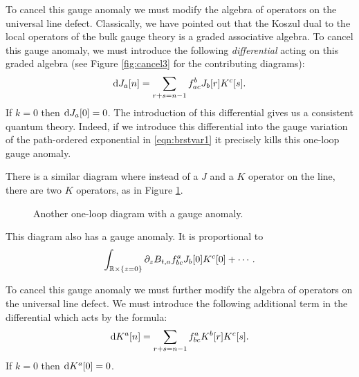 \documentclass[11pt]{amsart}
\def\brian#1{{\textcolor{blue!65!red}{BRW: {#1}}}}
\begin{document}
To cancel this gauge anomaly we must modify the algebra of operators on the universal line defect.
Classically, we have pointed out that the Koszul dual to the local operators of the bulk gauge theory is a graded associative algebra.
To cancel this gauge anomaly, we must introduce the following {\em differential} acting on this graded algebra (see Figure \ref{fig:cancel3} for the contributing diagrams):
\[
{\rm d} J_a[n] = \sum_{r + s = n-1} f_{ac}^b J_b[r] K^c[s] .
\]
If $k=0$ then ${\rm d} J_a [0] = 0$. 
The introduction of this differential gives us a consistent quantum theory. 
Indeed, if we introduce this differential into the gauge variation of the path-ordered exponential in \eqref{eqn:brstvar1} it precisely kills this one-loop gauge anomaly. 

There is a similar diagram where instead of a $J$ and a $K$ operator on the line, there are two $K$ operators, as in Figure \ref{fig:oneloop2}. 
\begin{figure}
	\caption{Another one-loop diagram with a gauge anomaly.
	\label{fig:oneloop2}}
\end{figure}
This diagram also has a gauge anomaly.
It is proportional to
\[
\int_{\mathbb R \times \{z=0\}} \partial_z B_{t,a} f_{bc}^a J_{b} [0] K^c [0] + \cdots .
\]

To cancel this gauge anomaly we must further modify the algebra of operators on the universal line defect.
We must introduce the following additional term in the differential which acts by the formula:
\[
{\rm d} K^a[n] = \sum_{r + s = n-1} f_{bc}^a K^b[r] K^c [s] .
\]
If $k=0$ then ${\rm d} K^a [0] = 0$. 

%
%
\end{document}
